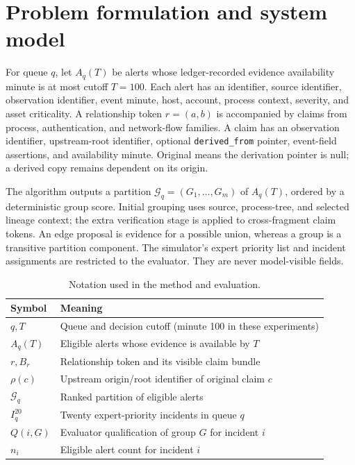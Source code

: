 \section{Problem formulation and system model}
For queue $q$, let $A_q(T)$ be alerts whose ledger-recorded evidence availability minute is at most cutoff $T=100$. Each alert has an identifier, source identifier, observation identifier, event minute, host, account, process context, severity, and asset criticality. A relationship token $r=(a,b)$ is accompanied by claims from process, authentication, and network-flow families. A claim has an observation identifier, upstream-root identifier, optional \texttt{derived\_from} pointer, event-field assertions, and availability minute. Original means the derivation pointer is null; a derived copy remains dependent on its origin.

The algorithm outputs a partition $\mathcal G_q=(G_1,\ldots,G_m)$ of $A_q(T)$, ordered by a deterministic group score. Initial grouping uses source, process-tree, and selected lineage context; the extra verification stage is applied to cross-fragment claim tokens. An edge proposal is evidence for a possible union, whereas a group is a transitive partition component. The simulator's expert priority list and incident assignments are restricted to the evaluator. They are never model-visible fields.

\begin{table}[ht]\centering\footnotesize\caption{Notation used in the method and evaluation.}\label{tab:notation}\begin{tabularx}{\linewidth}{@{}p{22mm}Y@{}}\toprule Symbol & Meaning\\\midrule $q,T$ & Queue and decision cutoff (minute 100 in these experiments)\\ $A_q(T)$ & Eligible alerts whose evidence is available by $T$\\ $r,B_r$ & Relationship token and its visible claim bundle\\ $\rho(c)$ & Upstream origin/root identifier of original claim $c$\\ $\mathcal G_q$ & Ranked partition of eligible alerts\\ $I_q^{20}$ & Twenty expert-priority incidents in queue $q$\\ $Q(i,G)$ & Evaluator qualification of group $G$ for incident $i$\\ $n_i$ & Eligible alert count for incident $i$\\\bottomrule\end{tabularx}\end{table}

